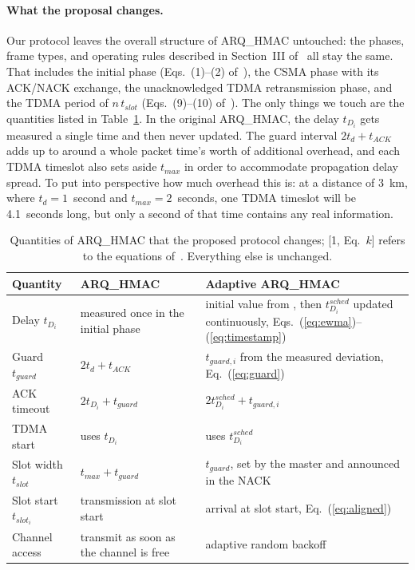 \documentclass{article}
\begin{document}
\paragraph{What the proposal changes.} Our protocol leaves the overall structure of ARQ\_HMAC untouched: the phases, frame types, and operating rules described in Section~III of~\cite{dao2025} all stay the same. That includes the initial phase (Eqs.~(1)--(2) of~\cite{dao2025}), the CSMA phase with its ACK/NACK exchange, the unacknowledged TDMA retransmission phase, and the TDMA period of $n\,t_{slot}$ (Eqs.~(9)--(10) of~\cite{dao2025}). The only things we touch are the quantities listed in Table~\ref{tab:changes}. In the original ARQ\_HMAC, the delay $t_{D_i}$ gets measured a single time and then never updated. The guard interval $2t_d + t_{ACK}$ adds up to around a whole packet time's worth of additional overhead, and each TDMA timeslot also sets aside $t_{max}$ in order to accommodate propagation delay spread. To put into perspective how much overhead this is: at a distance of 3~km, where $t_d = 1$~second and $t_{max} = 2$~seconds, one TDMA timeslot will be 4.1~seconds long, but only a second of that time contains any real information.

\begin{table}[H]
\centering
\caption{Quantities of ARQ\_HMAC that the proposed protocol changes; [1, Eq.~$k$] refers to the equations of~\cite{dao2025}. Everything else is unchanged.}
\label{tab:changes}
\small
{}
\begin{tabular}{@{}>{\raggedright\arraybackslash}p{3.9cm}>{\raggedright\arraybackslash}p{3.5cm}>{\raggedright\arraybackslash}p{4.8cm}@{}}
\toprule
\textbf{Quantity} & \textbf{ARQ\_HMAC} & \textbf{Adaptive ARQ\_HMAC} \\
\midrule
Delay $t_{D_i}$ \cite[Eq.~2]{dao2025} & measured once in the initial phase & initial value from \cite[Eq.~2]{dao2025}, then $t^{sched}_{D_i}$ updated continuously, Eqs.~(\ref{eq:ewma})--(\ref{eq:timestamp}) \\
Guard $t_{guard}$ \cite[Eq.~4]{dao2025} & $2t_d + t_{ACK}$ & $t_{guard,i}$ from the measured deviation, Eq.~(\ref{eq:guard}) \\
ACK timeout \cite[Eq.~3]{dao2025} & $2t_{D_i} + t_{guard}$ & $2t^{sched}_{D_i} + t_{guard,i}$ \\
TDMA start \cite[Eq.~5]{dao2025} & uses $t_{D_i}$ & uses $t^{sched}_{D_i}$ \\
Slot width $t_{slot}$ \cite[Eq.~6]{dao2025} & $t_{max} + t_{guard}$ & $t_{guard}$, set by the master and announced in the NACK \\
Slot start $t_{slot_i}$ \cite[Eq.~7]{dao2025} & transmission at slot start & arrival at slot start, Eq.~(\ref{eq:aligned}) \\
Channel access & transmit as soon as the channel is free & adaptive random backoff \\
\bottomrule
\end{tabular}
\end{table}
\end{document}
